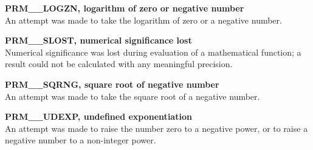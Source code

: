 \documentclass[11pt,nolof]{starlink}
\begin{document}
\begin{description}
\item \textbf{PRM\_\_LOGZN, logarithm of zero or negative number}\\
An attempt was made to take the logarithm of zero or a negative number.

\item \textbf{PRM\_\_SLOST, numerical significance lost}\\
Numerical significance was lost during evaluation of a mathematical
function; a result could not be calculated with any meaningful precision.

\item \textbf{PRM\_\_SQRNG, square root of negative number}\\
An attempt was made to take the square root of a negative number.

\item \textbf{PRM\_\_UDEXP, undefined exponentiation}\\
An attempt was made to raise the number zero to a negative power, or to raise a
negative number to a non-integer power.

\end{description}
\end{document}
